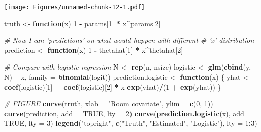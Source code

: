 \documentclass[]{article}
\newenvironment{Shaded}{\begin{snugshade}}{\end{snugshade}}
\newcommand{\KeywordTok}[1]{\textcolor[rgb]{0.13,0.29,0.53}{\textbf{#1}}}
\newcommand{\DataTypeTok}[1]{\textcolor[rgb]{0.13,0.29,0.53}{#1}}
\newcommand{\DecValTok}[1]{\textcolor[rgb]{0.00,0.00,0.81}{#1}}
\newcommand{\StringTok}[1]{\textcolor[rgb]{0.31,0.60,0.02}{#1}}
\newcommand{\CommentTok}[1]{\textcolor[rgb]{0.56,0.35,0.01}{\textit{#1}}}
\newcommand{\OtherTok}[1]{\textcolor[rgb]{0.56,0.35,0.01}{#1}}
\newcommand{\ControlFlowTok}[1]{\textcolor[rgb]{0.13,0.29,0.53}{\textbf{#1}}}
\newcommand{\OperatorTok}[1]{\textcolor[rgb]{0.81,0.36,0.00}{\textbf{#1}}}
\newcommand{\NormalTok}[1]{#1}
\let\oldShaded\Shaded
\let\endoldShaded\endShaded
\renewenvironment{Shaded}{\footnotesize\oldShaded}{\endoldShaded}
\begin{document}
\texttt{[image: Figures/unnamed-chunk-12-1.pdf]}

\begin{Shaded}
\begin{Highlighting}[]
\NormalTok{truth <-}\StringTok{ }\ControlFlowTok{function}\NormalTok{(x) }\DecValTok{1} \OperatorTok{-}\StringTok{ }\NormalTok{params[}\DecValTok{1}\NormalTok{] }\OperatorTok{*}\StringTok{ }\NormalTok{x}\OperatorTok{^}\NormalTok{params[}\DecValTok{2}\NormalTok{]}

\CommentTok{# Now I can 'predictions' on what would happen with different}
\CommentTok{# 'x' distribution}
\NormalTok{prediction <-}\StringTok{ }\ControlFlowTok{function}\NormalTok{(x) }\DecValTok{1} \OperatorTok{-}\StringTok{ }\NormalTok{thetahat[}\DecValTok{1}\NormalTok{] }\OperatorTok{*}\StringTok{ }\NormalTok{x}\OperatorTok{^}\NormalTok{thetahat[}\DecValTok{2}\NormalTok{]}

\CommentTok{# Compare with logistic regression}
\NormalTok{N <-}\StringTok{ }\KeywordTok{rep}\NormalTok{(n, nsize)}
\NormalTok{logistic <-}\StringTok{ }\KeywordTok{glm}\NormalTok{(}\KeywordTok{cbind}\NormalTok{(y, N) }\OperatorTok{~}\StringTok{ }\NormalTok{x, }\DataTypeTok{family =} \KeywordTok{binomial}\NormalTok{(logit))}
\NormalTok{prediction.logistic <-}\StringTok{ }\ControlFlowTok{function}\NormalTok{(x) \{}
\NormalTok{    yhat <-}\StringTok{ }\KeywordTok{coef}\NormalTok{(logistic)[}\DecValTok{1}\NormalTok{] }\OperatorTok{+}\StringTok{ }\KeywordTok{coef}\NormalTok{(logistic)[}\DecValTok{2}\NormalTok{] }\OperatorTok{*}\StringTok{ }\NormalTok{x}
    \KeywordTok{exp}\NormalTok{(yhat)}\OperatorTok{/}\NormalTok{(}\DecValTok{1} \OperatorTok{+}\StringTok{ }\KeywordTok{exp}\NormalTok{(yhat))}
\NormalTok{\}}

\CommentTok{# FIGURE}
\KeywordTok{curve}\NormalTok{(truth, }\DataTypeTok{xlab =} \StringTok{"Room covariate"}\NormalTok{, }\DataTypeTok{ylim =} \KeywordTok{c}\NormalTok{(}\DecValTok{0}\NormalTok{, }\DecValTok{1}\NormalTok{))}
\KeywordTok{curve}\NormalTok{(prediction, }\DataTypeTok{add =} \OtherTok{TRUE}\NormalTok{, }\DataTypeTok{lty =} \DecValTok{2}\NormalTok{)}
\KeywordTok{curve}\NormalTok{(}\KeywordTok{prediction.logistic}\NormalTok{(x), }\DataTypeTok{add =} \OtherTok{TRUE}\NormalTok{, }\DataTypeTok{lty =} \DecValTok{3}\NormalTok{)}
\KeywordTok{legend}\NormalTok{(}\StringTok{"topright"}\NormalTok{, }\KeywordTok{c}\NormalTok{(}\StringTok{"Truth"}\NormalTok{, }\StringTok{"Estimated"}\NormalTok{, }\StringTok{"Logistic"}\NormalTok{), }\DataTypeTok{lty =} \DecValTok{1}\OperatorTok{:}\DecValTok{3}\NormalTok{)}
\end{Highlighting}
\end{Shaded}
\end{document}
